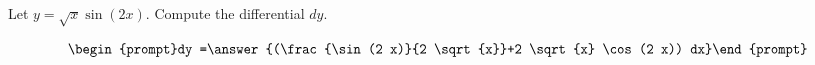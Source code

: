 \documentclass{ximera}
\author{Bart Snapp}
\begin{document}
\begin{exercise}

Let $y= \sqrt{x} \sin (2 x)$. Compute the differential $dy$.

\[
\begin{prompt}dy =\answer{(\frac{\sin (2 x)}{2 \sqrt{x}}+2 \sqrt{x} \cos (2 x)) dx}\end{prompt}
\]
\end{exercise}
\end{document}
